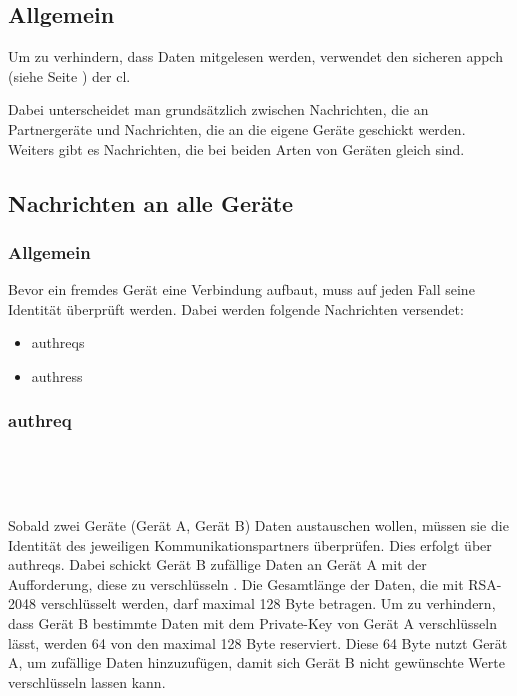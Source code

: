 \subsection{Allgemein}
Um zu verhindern, dass Daten mitgelesen werden, verwendet \sblit den sicheren \gls{appch} (siehe Seite \pageref{dcl-appch}) der \gls{cl}.

Dabei unterscheidet man grundsätzlich zwischen Nachrichten, die an Partnergeräte  und Nachrichten, die an die eigene Geräte geschickt werden. Weiters gibt es Nachrichten, die bei beiden Arten von Geräten gleich sind.

\subsection{Nachrichten an alle Geräte}
\subsubsection{Allgemein}
Bevor ein fremdes Gerät eine Verbindung aufbaut, muss auf jeden Fall seine Identität überprüft werden. Dabei werden folgende Nachrichten versendet:
\begin{itemize}
	\item \gls{authreq}s
	\item \gls{authres}s
\end{itemize}

\subsubsection{\gls{authreq}}
\messagestart
	 \\
	
	\begin{rightwordgroup}{\isprotomsgtype}
	\end{rightwordgroup} \\
	
	\begin{rightwordgroup}{\isprotomsgdata}
	\end{rightwordgroup}
	
Sobald zwei Geräte (Gerät A, Gerät B) Daten austauschen wollen, müssen sie die Identität des jeweiligen Kommunikationspartners überprüfen. Dies erfolgt über \gls{authreq}s. Dabei schickt Gerät B zufällige Daten an Gerät A mit der Aufforderung, diese zu verschlüsseln . 
Die Gesamtlänge der Daten, die mit RSA-2048 verschlüsselt werden, darf maximal 128 Byte betragen. Um zu verhindern, dass Gerät B bestimmte Daten mit dem Private-Key von Gerät A verschlüsseln lässt, werden 64 von den maximal 128 Byte reserviert. Diese 64 Byte nutzt Gerät A, um zufällige Daten hinzuzufügen, damit sich Gerät B nicht gewünschte Werte verschlüsseln lassen kann.

